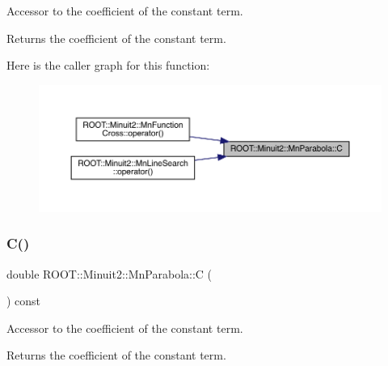 Accessor to the coefficient of the constant term.

\begin{DoxyReturn}{Returns}
the coefficient of the constant term. 
\end{DoxyReturn}
Here is the caller graph for this function\+:
\nopagebreak
\begin{figure}[H]
\begin{center}
\leavevmode
\includegraphics[width=350pt]{db/d7d/classROOT_1_1Minuit2_1_1MnParabola_a9ca632ea018da194e08eb18d4b0059f9_icgraph}
\end{center}
\end{figure}
\mbox{\label{classROOT_1_1Minuit2_1_1MnParabola_a9ca632ea018da194e08eb18d4b0059f9}} 
\subsubsection{\texorpdfstring{C()}{C()}\hspace{0.1cm}{\footnotesize\ttfamily [3/3]}}
{\footnotesize\ttfamily double R\+O\+O\+T\+::\+Minuit2\+::\+Mn\+Parabola\+::C (\begin{DoxyParamCaption}{ }\end{DoxyParamCaption}) const\hspace{0.3cm}{\ttfamily [inline]}}

Accessor to the coefficient of the constant term.

\begin{DoxyReturn}{Returns}
the coefficient of the constant term. 
\end{DoxyReturn}
\mbox{\label{classROOT_1_1Minuit2_1_1MnParabola_ab3c7e51f6276d9ebf6d28fe965914bc8}} 
